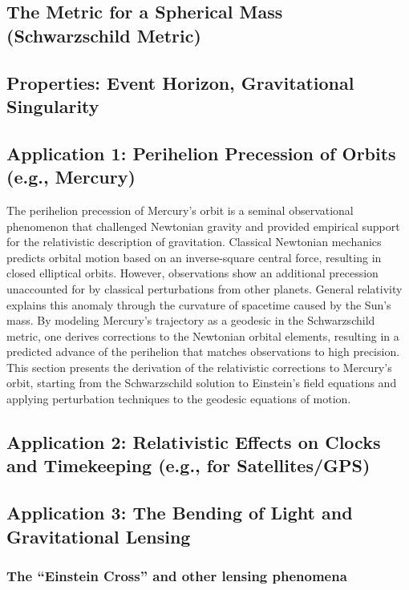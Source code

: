 \documentclass{amsart}
\theoremstyle{definition}
\theoremstyle{remark}
\begin{document}
\subsection{The Metric for a Spherical Mass (Schwarzschild Metric)}

\subsection{Properties: Event Horizon, Gravitational Singularity}

\subsection{Application 1: Perihelion Precession of Orbits (e.g., Mercury)}
\label{subsec:mercury_precession}
The perihelion precession of Mercury’s orbit is a seminal observational phenomenon that challenged Newtonian gravity and provided empirical support for the relativistic description of gravitation.
Classical Newtonian mechanics predicts orbital motion based on an inverse-square central force, resulting in closed elliptical orbits.
However, observations show an additional precession unaccounted for by classical perturbations from other planets.
General relativity explains this anomaly through the curvature of spacetime caused by the Sun’s mass.
By modeling Mercury’s trajectory as a geodesic in the Schwarzschild metric, one derives corrections to the Newtonian orbital elements, resulting in a predicted advance of the perihelion that matches observations to high precision.
This section presents the derivation of the relativistic corrections to Mercury’s orbit, starting from the Schwarzschild solution to Einstein’s field equations and applying perturbation techniques to the geodesic equations of motion.

\subsection{Application 2: Relativistic Effects on Clocks and Timekeeping (e.g., for Satellites/GPS)}

\subsection{Application 3: The Bending of Light and Gravitational Lensing}
\subsubsection{The ``Einstein Cross'' and other lensing phenomena}
\end{document}
